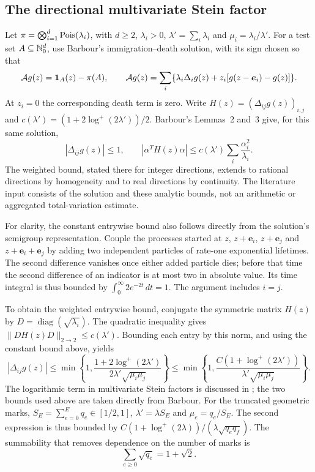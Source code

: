 \subsection{The directional multivariate Stein factor}\label{supp:sec:stein-factor}
Let $\pi=\bigotimes_{i=1}^d\operatorname{Pois}(\lambda_i)$, with $d\ge2$,
$\lambda_i>0$, $\lambda'=\sum_i\lambda_i$ and
$\mu_i=\lambda_i/\lambda'$. For a test set $A\subseteq\mathbb N_0^d$, use
Barbour's immigration--death solution, with its sign chosen so that
\[
 \mathcal A g(z)=\mathbf 1_A(z)-\pi(A),\qquad
 \mathcal A g(z)=\sum_i\{\lambda_i\Delta_i g(z)
                           +z_i[g(z-\boldsymbol e_i)-g(z)]\}.
\]
At $z_i=0$ the corresponding death term is zero.
Write $H(z)=(\Delta_{ij}g(z))_{i,j}$ and
$c(\lambda')=(1+2\log^+(2\lambda'))/2$.
Barbour's Lemmas~2 and~3 \cite[p.~179]{Barbour1988SteinProcess}
give, for this same solution,
\[
 |\Delta_{ij}g(z)|\le1,\qquad
 |\alpha^T H(z)\alpha|
 \le c(\lambda')\sum_i\frac{\alpha_i^2}{\lambda_i}.
\]
The weighted bound, stated there for integer directions, extends to
rational directions by homogeneity and to real directions by continuity.
The literature input consists of the solution and these analytic bounds,
not an arithmetic or aggregated total-variation estimate.

For clarity, the constant entrywise bound also follows directly from the
solution's semigroup representation. Couple the processes started at
$z$, $z+\boldsymbol e_i$, $z+\boldsymbol e_j$ and
$z+\boldsymbol e_i+\boldsymbol e_j$ by adding two independent particles
of rate-one exponential lifetimes. The second difference vanishes once
either added particle dies; before that time the second difference of an
indicator is at most two in absolute value. Its time integral is thus
bounded by $\int_0^\infty 2e^{-2t}\,dt=1$. The argument includes $i=j$.

To obtain the weighted entrywise bound, conjugate the symmetric matrix
$H(z)$ by $D=\operatorname{diag}(\sqrt{\lambda_i})$.
The quadratic inequality gives $\|D H(z)D\|_{2\to2}\le c(\lambda')$.
Bounding each entry by this norm, and using the constant bound above,
yields
\begin{equation}\label{supp:eq:directional-factor}
 |\Delta_{ij}g(z)|\le
 \min\left\{1,\frac{1+2\log^+(2\lambda')}
                    {2\lambda'\sqrt{\mu_i\mu_j}}\right\}
 \le\min\left\{1,\frac{C(1+\log^+(2\lambda'))}
                    {\lambda'\sqrt{\mu_i\mu_j}}\right\}.
\end{equation}
The logarithmic term in multivariate Stein factors is discussed in
\cite{Rollin2012SteinFactors}; the two bounds used above are taken directly
from Barbour.
For the truncated geometric marks,
$S_E=\sum_{e=0}^Eq_e\in[1/2,1]$, $\lambda'=\lambda S_E$ and
$\mu_e=q_e/S_E$. The second expression is thus bounded by
$C(1+\log^+(2\lambda))/(\lambda\sqrt{q_eq_f})$.
The summability that removes dependence on the number of marks is
\begin{equation}\label{supp:eq:square-root-sum}
 \sum_{e\ge0}\sqrt{q_e}=1+\sqrt2.
\end{equation}

